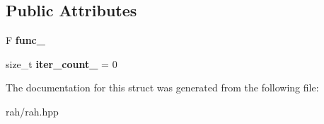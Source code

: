 \subsection*{Public Attributes}
\begin{DoxyCompactItemize}
\item 
\mbox{\label{struct_r_a_h___n_a_m_e_s_p_a_c_e_1_1view_1_1gererate__iterator_ab5ab182d996393a241875b31c7b0bf54}} 
F {\bfseries func\+\_\+}
\item 
\mbox{\label{struct_r_a_h___n_a_m_e_s_p_a_c_e_1_1view_1_1gererate__iterator_a869a72697b13c3f8a2a54aa99c094952}} 
size\+\_\+t {\bfseries iter\+\_\+count\+\_\+} = 0
\end{DoxyCompactItemize}


The documentation for this struct was generated from the following file\+:\begin{DoxyCompactItemize}
\item 
rah/rah.\+hpp\end{DoxyCompactItemize}
